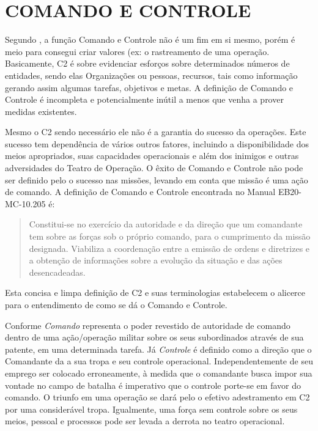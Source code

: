 \chapter{COMANDO E CONTROLE}

Segundo \cite{undestanding2006}, a função Comando e Controle não é um fim em si mesmo, porém é meio para consegui criar valores (ex: o rastreamento de uma operação. Basicamente, C2 é sobre evidenciar esforços sobre determinados números de entidades, sendo elas Organizações ou pessoas, recursos, tais como informação gerando assim algumas tarefas, objetivos e metas. A definição de Comando e Controle é  incompleta e potencialmente inútil a menos que venha a prover medidas existentes. 


Mesmo o C2 sendo necessário ele não é a garantia do sucesso da operações. Este sucesso tem dependência de vários outros fatores, incluindo a disponibilidade dos meios apropriados, suas capacidades operacionais e além dos inimigos e outras adversidades do Teatro de Operação. O êxito de Comando e Controle não pode ser definido pelo o sucesso nas missões, levando em conta que missão é uma ação de comando.
A definição de Comando e Controle encontrada no Manual EB20-MC-10.205 é:
\begin{quote}
 Constitui-se  no  exercício  da  autoridade  e  da  direção que um comandante tem sobre as forças sob o próprio comando, para o cumprimento da missão  designada.  Viabiliza  a  coordenação  entre  a  emissão  de  ordens  e  diretrizes  e  a  obtenção de informações sobre a evolução da situação e das ações desencadeadas. \cite{comandoecontrole2015}
\end{quote}
Esta concisa e limpa definição de C2 e suas terminologias estabelecem o alicerce para o entendimento de como se dá o Comando e Controle. 


Conforme  \cite{comandoecontrole2015} \textit{Comando} representa o poder revestido de autoridade de comando dentro de uma ação/operação militar sobre os seus subordinados através de sua patente, em uma determinada tarefa. Já \textit{Controle}  é definido como a direção que o Comandante da a sua tropa e seu controle operacional. Independentemente de seu emprego ser colocado erroneamente, à medida que o comandante busca impor sua vontade no campo de batalha é imperativo que o controle porte-se em favor do comando. O triunfo em uma operação se dará pelo o efetivo adestramento em C2 por uma considerável tropa. Igualmente, uma força sem controle sobre os seus meios, pessoal e processos pode ser levada a derrota no teatro operacional. 


